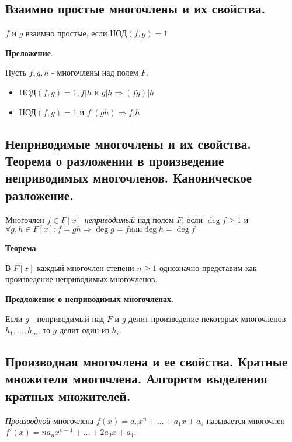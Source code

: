 \documentclass[a4paper]{article}
\begin{document}
\subsection*{Взаимно простые многочлены и их свойства.}

$f$ и $g$ взаимно простые, если $\text{НОД}(f,g) = 1$

\begin{htheorem}\textbf{Преложение}.

Пусть $f, g, h$ - многочлены над полем $F$.

\begin{itemize}
\item $\text{НОД}(f,g) = 1, f|h$ и  $g|h \Rightarrow (fg)|h$
\item $\text{НОД}(f,g) = 1$ и $f|(gh) \Rightarrow f|h$
\end{itemize}

\end{htheorem}

\subsection*{Неприводимые многочлены и их свойства. Теорема о разложении в произведение неприводимых многочленов. Каноническое разложение.}

Многочлен $f \in F[x]$ \textit{неприводимый} над полем $F$, если $\deg f \geq 1$ и $\forall g, h \in F[x]: f = gh \Rightarrow \deg g = f \text{или} \deg h = \deg f$

\begin{htheorem}\textbf{Теорема}.

В $F[x]$ каждый многочлен степени $n \geq 1$ однозначно представим как произведение неприводимых многочленов.
\end{htheorem}

\begin{htheorem}\textbf{Предложение о неприводимых многочленах}.

Если $g$ - неприводимый над $F$ и $g$ делит произведение некоторых многочленов $h_1, ..., h_m$, то $g$ делит один из $h_i$.
\end{htheorem}

\subsection{Производная многочлена и ее свойства. Кратные множители многочлена. Алгоритм выделения кратных множителей.}

\textit{Производной} многочлена $f(x) = a_nx^n + ... + a_1x + a_0$ называется многочлен $f'(x) = na_nx^{n-1} + ... + 2a_2x + a_1$.
\end{document}
